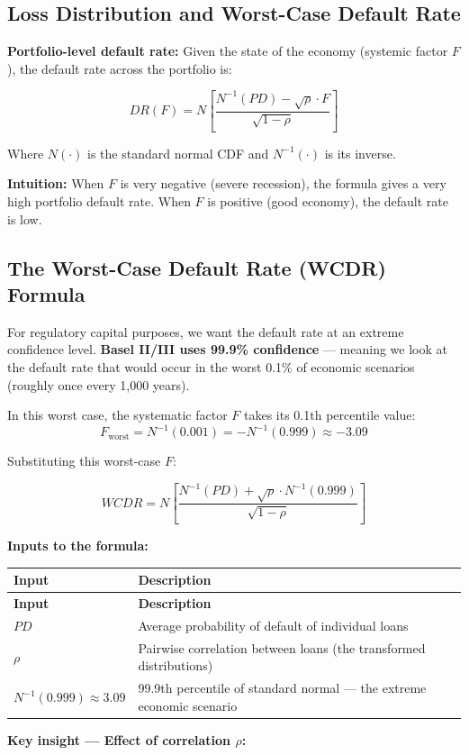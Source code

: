 \documentclass[12pt,openany]{book}
\theoremstyle{definition}
\theoremstyle{remark}
\begin{document}
\medskip
\subsection{Loss Distribution and Worst-Case Default Rate}
\textbf{Portfolio-level default rate:} Given the state of the economy (systemic factor $F$), the default rate across the portfolio is:

\[
DR(F) = N\left[\frac{N^{-1}(PD) - \sqrt{\rho} \cdot F}{\sqrt{1-\rho}}\right]
\]

Where $N(\cdot)$ is the standard normal CDF and $N^{-1}(\cdot)$ is its inverse.

\textbf{Intuition:} When $F$ is very negative (severe recession), the formula gives a very high portfolio default rate. When $F$ is positive (good economy), the default rate is low.

\medskip
\subsection{The Worst-Case Default Rate (WCDR) Formula}
For regulatory capital purposes, we want the default rate at an extreme confidence level. \textbf{Basel II/III uses 99.9\% confidence} --- meaning we look at the default rate that would occur in the worst 0.1\% of economic scenarios (roughly once every 1,000 years).

In this worst case, the systematic factor $F$ takes its 0.1th percentile value: \[
F_{\text{worst}} = N^{-1}(0.001) = -N^{-1}(0.999) \approx -3.09
\]

Substituting this worst-case $F$:

\[
\boxed{WCDR = N\left[\frac{N^{-1}(PD) + \sqrt{\rho} \cdot N^{-1}(0.999)}{\sqrt{1-\rho}}\right]}
\]

\textbf{Inputs to the formula:}

\begingroup
\footnotesize
\begin{longtable}{@{}L{0.27\textwidth}L{0.66\textwidth}@{}}
\toprule
\textbf{Input} & \textbf{Description} \\
\midrule
\endfirsthead
\toprule
\textbf{Input} & \textbf{Description} \\
\midrule
\endhead
$PD$ & Average probability of default of individual loans \\
$\rho$ & Pairwise correlation between loans (the transformed distributions) \\
$N^{-1}(0.999) \approx 3.09$ & 99.9th percentile of standard normal --- the extreme economic scenario \\
\bottomrule
\end{longtable}
\endgroup
\textbf{Key insight --- Effect of correlation \(\rho\):}
\end{document}
